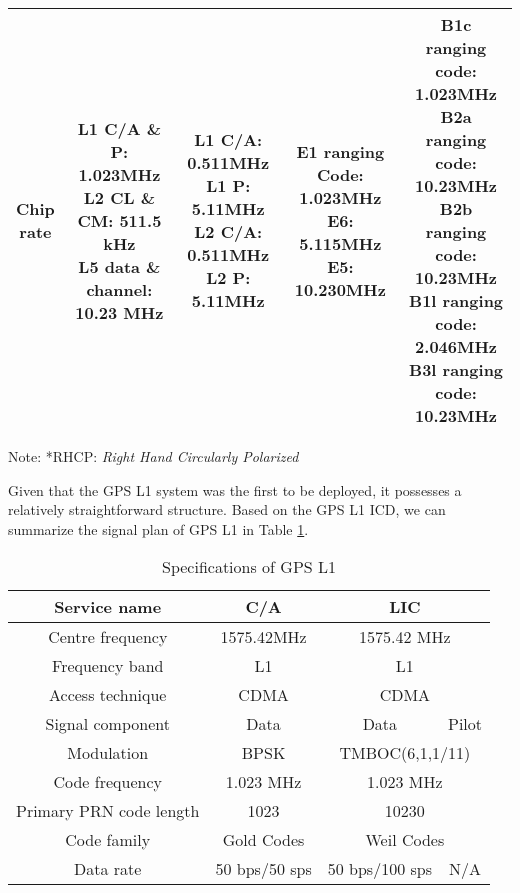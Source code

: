 \begin{landscape}
\begin{center}
\begin{table}
\begin{tabular}{ccccc}
    \thead{Chip\\rate} & \thead{L1 C/A \& P: 1.023MHz\\L2 CL \& CM: 511.5 kHz\\L5 data \& channel: 10.23 MHz} & \thead{L1 C/A: 0.511MHz\\L1 P: 5.11MHz\\L2 C/A: 0.511MHz\\L2 P: 5.11MHz} & \thead{E1 ranging Code: 1.023MHz\\E6: 5.115MHz\\E5: 10.230MHz} & \thead{B1c ranging code: 1.023MHz\\B2a ranging code: 10.23MHz\\B2b ranging code: 10.23MHz\\B1l ranging code: 2.046MHz\\B3l ranging code: 10.23MHz}\\
    \bottomrule
    \end{tabular}
    \footnotesize Note: *RHCP: \textit{Right Hand Circularly Polarized}
\end{table}
\end{center}
\end{landscape}
Given that the GPS L1 system was the first to be deployed\cite{RN184}, it possesses a relatively straightforward structure. Based on the GPS L1 ICD\cite{RN170}, we can summarize the signal plan of GPS L1 in Table \ref{tab:spec_gpsl1}.

\begin{table}[!htbp]
\centering
\caption{Specifications of GPS L1}\label{tab:spec_gpsl1}
\renewcommand\arraystretch{1.5}
\begin{tabular}{c@{\hspace{1.3cm}}c@{\hspace{1.3cm}}cc}
    \toprule
    Service name & C/A & \multicolumn{2}{c}{LIC} \\
    \midrule
    Centre frequency & 1575.42MHz & \multicolumn{2}{c}{1575.42 MHz} \\
    Frequency band & L1 & \multicolumn{2}{c}{L1} \\
    Access technique & CDMA & \multicolumn{2}{c}{CDMA} \\
    Signal component & Data & Data & Pilot \\
    Modulation & BPSK & \multicolumn{2}{c}{TMBOC(6,1,1/11)} \\
    Code frequency & 1.023 MHz & \multicolumn{2}{c}{1.023 MHz} \\
    Primary PRN code length & \num{1023} & \multicolumn{2}{c}{\num{10230}} \\
    Code family & Gold Codes & \multicolumn{2}{c}{Weil Codes} \\
    Data rate & 50 bps/50 sps & 50 bps/100 sps & N/A \\
    \bottomrule
\end{tabular}
\end{table}

